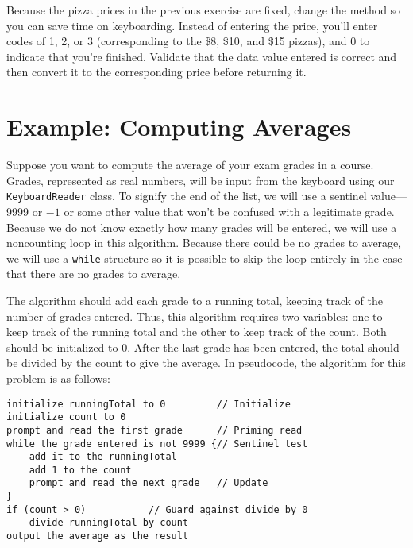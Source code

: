 \begin{SSTUDY}
\item  Because the pizza prices in the previous exercise are fixed, change
the method so you can save time on keyboarding. Instead of entering
the price, you'll enter codes of 1, 2, or 3 (corresponding to the
\$8, \$10, and \$15 pizzas), and 0 to indicate that you're finished. Validate that the
data value entered is correct and then convert it to the
corresponding price before returning it.

\end{SSTUDY}


\section{Example: Computing Averages}
\label{example-computing-averages}
\noindent Suppose you want to compute the average of your exam grades in a
  course.  Grades,
represented as real numbers, will be input from the keyboard using our
{\tt KeyboardReader} class. To signify the end of the list, we will
use a sentinel value---9999 or $-1$ or some other value that won't be
confused with a legitimate grade. Because we do not know exactly how
many grades will be entered, we will use a noncounting loop in this
algorithm. Because there could be no grades to average, we will use a
{\tt while} structure so it is possible to skip the loop entirely in
the case that there are no grades to average.

The algorithm should add each grade to a running total, keeping track
of the number of grades entered. Thus, this algorithm requires two
variables: one to keep track of the running total and the other to
keep track of the count. Both should be initialized to 0.  After the
last grade has been entered, the total should be divided by the count
to give the average.  In pseudocode, the algorithm for this problem is
as follows:

\begin{jjjlisting}
\begin{lstlisting}
initialize runningTotal to 0         // Initialize
initialize count to 0
prompt and read the first grade      // Priming read
while the grade entered is not 9999 {// Sentinel test
    add it to the runningTotal
    add 1 to the count
    prompt and read the next grade   // Update
}
if (count > 0)           // Guard against divide by 0
    divide runningTotal by count
output the average as the result
\end{lstlisting}
\end{jjjlisting}

